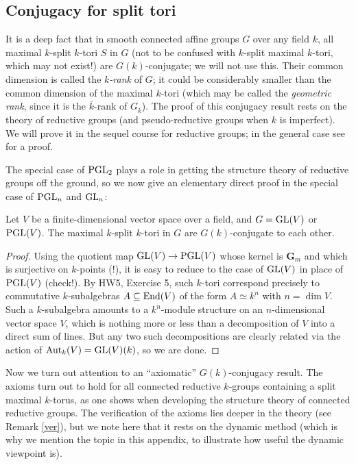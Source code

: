 \documentclass[10pt]{article}
\renewcommand{\(}{\left(}
\renewcommand{\)}{\right)}
\numberwithin{thm}{subsection}
\begin{document}
\subsection{Conjugacy for split tori}

It is a deep fact that in smooth connected affine groups $G$ over any field $k$, all 
maximal $k$-split $k$-tori $S$ in $G$ 
(not to be confused with $k$-split maximal $k$-tori, which may not exist!) are $G(k)$-conjugate;
we will not use this.  Their common dimension is called the {\em $k$-rank} of $G$; it could be considerably smaller
than the common dimension of the maximal $k$-tori (which may be called the {\em geometric rank},
since it is the $\overline{k}$-rank of $G_{\overline{k}}$).  The proof of this conjugacy result 
rests on the theory of reductive groups (and pseudo-reductive groups
when $k$ is imperfect).  We will prove it in the sequel course for reductive groups;
in the general case see \cite[Thm.\,C.2.3]{pred} for a proof. 

The special case of ${\rm{PGL}}_2$ plays a role in getting the structure theory of reductive groups
off the ground, so we now give an elementary direct proof in the special case of
${\rm{PGL}}_n$ and ${\rm{GL}}_n$:


\begin{proposition} Let $V$ be a finite-dimensional vector space over a field,
and $G = {\rm{GL}}(V)$ or ${\rm{PGL}}(V)$.  The maximal $k$-split $k$-tori in $G$
are $G(k)$-conjugate to each other.  
\end{proposition}

\begin{proof}
Using the quotient map ${\rm{GL}}(V) \rightarrow {\rm{PGL}}(V)$ whose kernel is
$\mathbf{G}_m$ and which is surjective on $k$-points (!), it is easy to reduce to the case of
${\rm{GL}}(V)$ in place of ${\rm{PGL}}(V)$ (check!).  By  HW5, Exercise 5, such $k$-tori
correspond precisely to commutative $k$-subalgebras $A \subseteq {\rm{End}}(V)$ of
the form $A \simeq k^n$ with $n = \dim V$.  Such a $k$-subalgebra amounts to a $k^n$-module
structure on an $n$-dimensional vector space $V$, which is nothing more or less than a decomposition
of $V$ into a direct sum of lines.  But any two such decompositions are clearly related via the action of
${\rm{Aut}}_k(V) = {\rm{GL}}(V)(k)$, so we are done.  
\end{proof}

Now we turn out attention to an ``axiomatic'' $G(k)$-conjugacy result.  The axioms turn out to hold for
all connected reductive $k$-groups containing a split maximal $k$-torus, as one shows when developing
the structure theory of connected reductive groups.  The verification of the axioms lies deeper in the theory
(see Remark \ref{ver}), but we note here that it rests on the dynamic method (which is why we mention
the topic in this appendix, to illustrate how useful the dynamic viewpoint is).
\end{document}
